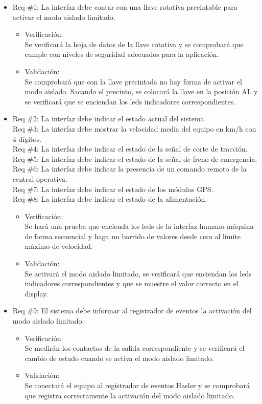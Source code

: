 \documentclass[11pt]{charter}
\begin{document}
\begin{itemize}
\item Req \#1: La interfaz debe contar con una llave rotativa precintable para activar el modo aislado limitado.
\begin{itemize}
  \item Verificación:\\
  Se verificará la hoja de datos de la llave rotativa y se comprobará que cumple con niveles de seguridad adecuados para la aplicación.
  \item Validación:\\
  Se comprobará que con la llave precintada no hay forma de activar el modo aislado. Sacando el precinto, se colocará la llave en la posición AL y se verificará que se enciendan los leds indicadores correspondientes.
\end{itemize}

\item Req \#2: La interfaz debe indicar el estado actual del sistema. \\
Req \#3: La interfaz debe mostrar la velocidad media del equipo en km/h con 4 dígitos. \\
Req \#4: La interfaz debe indicar el estado de la señal de corte de tracción. \\
Req \#5: La interfaz debe indicar el estado de la señal de freno de emergencia. \\
Req \#6: La interfaz debe indicar la presencia de un comando remoto de la central operativa. \\
Req \#7: La interfaz debe indicar el estado de los módulos GPS. \\
Req \#8: La interfaz debe indicar el estado de la alimentación.
\begin{itemize}
  \item Verificación:\\
  Se hará una prueba que encienda los leds de la interfaz humano-máquina de forma secuencial y haga un barrido de valores desde cero al límite máximo de velocidad.
  \item Validación:\\
  Se activará el modo aislado limitado, se verificará que enciendan los leds indicadores correspondientes y que se muestre el valor correcto en el display.
\end{itemize}

\item Req \#9: El sistema debe informar al registrador de eventos la activación del modo aislado limitado.
\begin{itemize}
  \item Verificación:\\
  Se medirán los contactos de la salida correspondiente y se verificará el cambio de estado cuando se activa el modo aislado limitado.
  \item Validación:\\
  Se conectará el equipo al registrador de eventos Hasler y se comprobará que registra correctamente la activación del modo aislado limitado.
\end{itemize}


\end{itemize}
\end{document}
